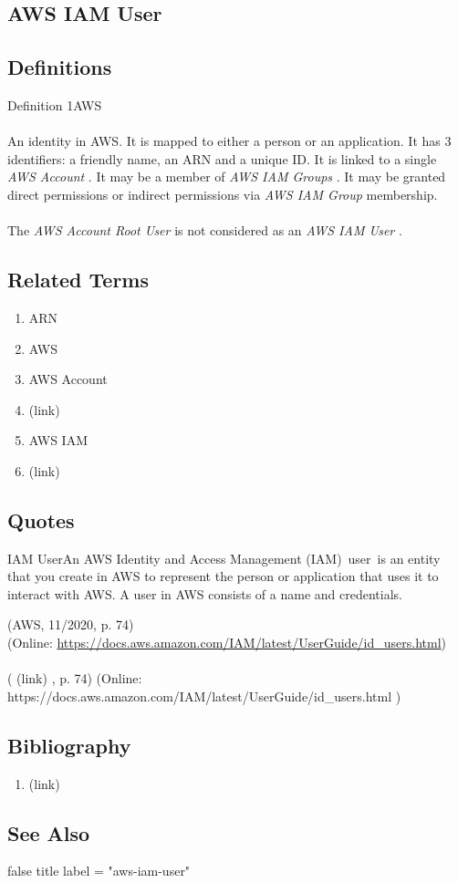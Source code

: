 \newpage \subsection*{AWS IAM User } \subsection*{Definitions } \begin{DIC_Def}{Definition 1AWS }{} \paragraph{} An identity in AWS. It is mapped to either a person or an application. It has 3 identifiers: a friendly name, an ARN and a unique ID. It is linked to a single  \emph{ AWS Account  } . It may be a member of  \emph{ AWS IAM Groups  } . It may be granted direct permissions or indirect permissions via  \emph{ AWS IAM Group  } membership.  \paragraph{} The  \emph{ AWS Account Root User  } is not considered as an  \emph{ AWS IAM User  } .  \end{DIC_Def} \subsection*{Related Terms } \begin{enumerate} \item  ARN  \item  AWS  \item  AWS Account  \item  (link) \href{AWS Account Root User (Dictionary Entry) }{ }   \item  AWS IAM  \item  (link) \href{AWS IAM Group (Dictionary Entry) }{ }   \end{enumerate} \subsection*{Quotes } \begin{DIC_BlockQuote} IAM UserAn AWS Identity and Access Management (IAM)~user~is an entity that you create in AWS to represent the person or application that uses it to interact with AWS. A user in AWS consists of a name and credentials.  \end{DIC_BlockQuote} (AWS, 11/2020, p. 74)\\ (Online: \url{https://docs.aws.amazon.com/IAM/latest/UserGuide/id_users.html})  \paragraph{} (  (link) \href{AWS, 11/2020 }{ } , p. 74)  (Online:  https://docs.aws.amazon.com/IAM/latest/UserGuide/id\_users.html  )  \subsection*{Bibliography } \begin{enumerate} \item  (link) \href{AWS, 11/2020 }{ }   \end{enumerate} \subsection*{See Also } false  title  label = "aws-iam-user"  